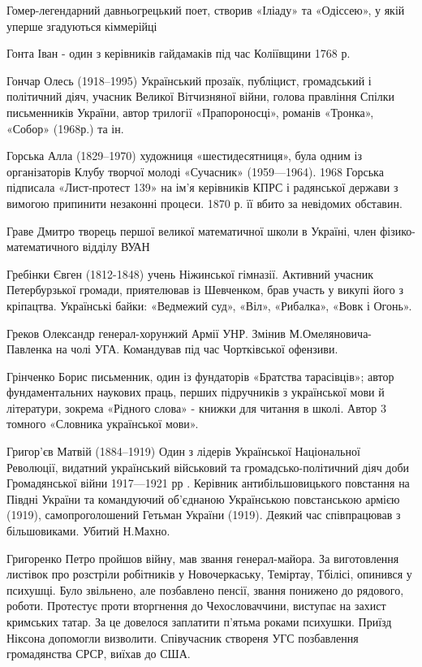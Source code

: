 Гомер-легендарний давньогрецький поет, створив «Іліаду» та «Одіссею», у якій уперше згадуються кіммерійці

Гонта Іван  - один з керівників гайдамаків під час Коліївщини 1768 р. 

Гончар Олесь (1918–1995) Український прозаїк, публіцист, громадський і політичний діяч, учасник Великої Вітчизняної війни, голова правління Спілки письменників України, автор трилогії «Прапороносці», романів «Тронка», «Собор» (1968р.) та ін. 

Горська Алла (1829–1970) художниця «шестидесятниця», була одним із організаторів Клубу творчої молоді «Сучасник» (1959—1964). 1968 Горська підписала «Лист-протест 139» на ім'я керівників КПРС і радянської держави з вимогою припинити незаконні процеси. 1870 р. її вбито за невідомих обставин.

Граве Дмитро творець першої великої математичної школи в Україні, член фізико-математичного відділу ВУАН 

Гребінки Євген (1812-1848) учень Ніжинської гімназії. Активний учасник Петербурзької громади, приятелював із Шевченком, брав участь у викупі його з кріпацтва. Українські байки: «Ведмежий суд», «Віл», «Рибалка», «Вовк і Огонь».

Греков Олександр  генерал-хорунжий Армії УНР. Змінив М.Омеляновича-Павленка на чолі УГА. Командував під час Чортківської офензиви.

Грінченко Борис письменник, один із фундаторів «Братства тарасівців»; автор фундаментальних наукових праць, перших підручників з української мови й літератури, зокрема «Рідного слова» - книжки для читання в школі. Автор 3 томного «Словника української мови».

Григор’єв Матвій  (1884–1919) Один з лідерів Української Національної Революції, видатний український військовий та громадсько-політичний діяч доби Громадянської війни 1917—1921 рр . Керівник антибільшовицького повстання на Півдні України та командуючий об’єднаною Українською повстанською армією (1919), самопроголошений Гетьман України (1919). Деякий час співпрацював з більшовиками. Убитий Н.Махно.

Григоренко Петро пройшов війну, мав звання генерал-майора. За виготовлення листівок про розстріли робітників у Новочеркаську, Теміртау, Тбілісі, опинився у психушці. Було звільнено, але позбавлено пенсії, звання понижено до рядового, роботи. Протестує проти вторгнення до Чехословаччини, виступає на захист кримських татар. За це довелося заплатити п’ятьма роками психушки. Приїзд Ніксона допомогли визволити. Співучасник створеня УГС позбавлення громадянства СРСР, виїхав до США.

